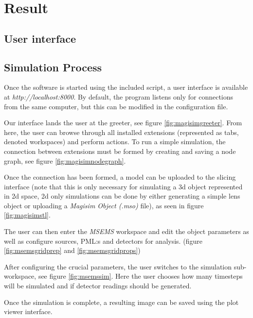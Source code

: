 \documentclass[11pt, a4paper, titlepage]{article}
\begin{document}
\newpage
\section{Result}
\subsection{User interface}


\subsection{Simulation Process}
Once the software is started using the included script, a user interface is available at \textit{http://localhost:8000}. By default, the program listens only for connections from the same computer, but this can be modified in the configuration file.

Our interface lands the user at the greeter, see figure \ref{fig:magisimgreeter}. From here, the user can browse through all installed extensions (represented as tabs, denoted workspaces) and perform actions.
To run a simple simulation, the connection between extensions must be formed by creating and saving a node graph, see figure \ref{fig:magisimnodegraph}. 

Once the connection has been formed, a model can be uploaded to the slicing interface (note that this is only necessary for simulating a 3d object represented in 2d space, 2d only simulations can be done by either generating a simple lens object or uploading a \textit{Magisim Object (.mso)} file), as seen in figure \ref{fig:magisimstl}. 

The user can then enter the \textit{MSEMS} workspace and edit the object parameters as well as configure sources, PML:s and detectors for analysis. (figure \ref{fig:msemsgridprep} and \ref{fig:msemsgridprops})

After configuring the crucial parameters, the user switches to the simulation sub-workspace, see figure \ref{fig:msemssim}. Here the user chooses how many timesteps will be simulated and if detector readings should be generated.

Once the simulation is complete, a resulting image can be saved using the plot viewer interface.


\end{document}
